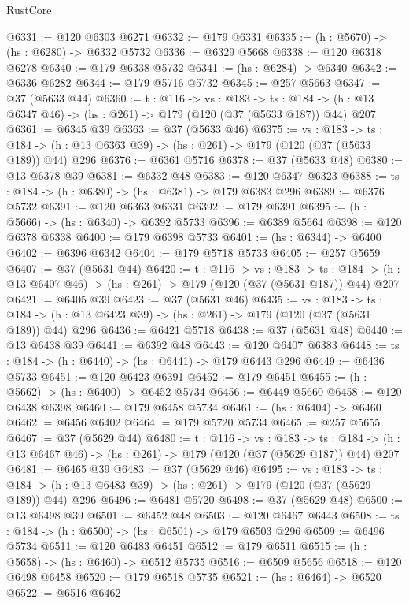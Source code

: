 \begin{lexlean}{RustCore}
\begin{coremodule}
@6331 := @120 @6303 @6271
@6332 := @179 @6331
@6335 := (h : @5670) -> (hs : @6280) -> @6332 @5732
@6336 := @6329 @5668
@6338 := @120 @6318 @6278
@6340 := @179 @6338 @5732
@6341 := (hs : @6284) -> @6340
@6342 := @6336 @6282
@6344 := @179 @5716 @5732
@6345 := @257 @5663
@6347 := @37 (@5633 @44)
@6360 := {t : @116} ->
  {vs : @183} ->
  {ts : @184} -> (h : @13 @6347 @46) -> (hs : @261) -> @179 (@120 (@37 (@5633 @187)) @44) @207
@6361 := @6345 @39
@6363 := @37 (@5633 @46)
@6375 := {vs : @183} ->
  {ts : @184} -> (h : @13 @6363 @39) -> (hs : @261) -> @179 (@120 (@37 (@5633 @189)) @44) @296
@6376 := @6361 @5716
@6378 := @37 (@5633 @48)
@6380 := @13 @6378 @39
@6381 := @6332 @48
@6383 := @120 @6347 @6323
@6388 := {ts : @184} -> (h : @6380) -> (hs : @6381) -> @179 @6383 @296
@6389 := @6376 @5732
@6391 := @120 @6363 @6331
@6392 := @179 @6391
@6395 := (h : @5666) -> (hs : @6340) -> @6392 @5733
@6396 := @6389 @5664
@6398 := @120 @6378 @6338
@6400 := @179 @6398 @5733
@6401 := (hs : @6344) -> @6400
@6402 := @6396 @6342
@6404 := @179 @5718 @5733
@6405 := @257 @5659
@6407 := @37 (@5631 @44)
@6420 := {t : @116} ->
  {vs : @183} ->
  {ts : @184} -> (h : @13 @6407 @46) -> (hs : @261) -> @179 (@120 (@37 (@5631 @187)) @44) @207
@6421 := @6405 @39
@6423 := @37 (@5631 @46)
@6435 := {vs : @183} ->
  {ts : @184} -> (h : @13 @6423 @39) -> (hs : @261) -> @179 (@120 (@37 (@5631 @189)) @44) @296
@6436 := @6421 @5718
@6438 := @37 (@5631 @48)
@6440 := @13 @6438 @39
@6441 := @6392 @48
@6443 := @120 @6407 @6383
@6448 := {ts : @184} -> (h : @6440) -> (hs : @6441) -> @179 @6443 @296
@6449 := @6436 @5733
@6451 := @120 @6423 @6391
@6452 := @179 @6451
@6455 := (h : @5662) -> (hs : @6400) -> @6452 @5734
@6456 := @6449 @5660
@6458 := @120 @6438 @6398
@6460 := @179 @6458 @5734
@6461 := (hs : @6404) -> @6460
@6462 := @6456 @6402
@6464 := @179 @5720 @5734
@6465 := @257 @5655
@6467 := @37 (@5629 @44)
@6480 := {t : @116} ->
  {vs : @183} ->
  {ts : @184} -> (h : @13 @6467 @46) -> (hs : @261) -> @179 (@120 (@37 (@5629 @187)) @44) @207
@6481 := @6465 @39
@6483 := @37 (@5629 @46)
@6495 := {vs : @183} ->
  {ts : @184} -> (h : @13 @6483 @39) -> (hs : @261) -> @179 (@120 (@37 (@5629 @189)) @44) @296
@6496 := @6481 @5720
@6498 := @37 (@5629 @48)
@6500 := @13 @6498 @39
@6501 := @6452 @48
@6503 := @120 @6467 @6443
@6508 := {ts : @184} -> (h : @6500) -> (hs : @6501) -> @179 @6503 @296
@6509 := @6496 @5734
@6511 := @120 @6483 @6451
@6512 := @179 @6511
@6515 := (h : @5658) -> (hs : @6460) -> @6512 @5735
@6516 := @6509 @5656
@6518 := @120 @6498 @6458
@6520 := @179 @6518 @5735
@6521 := (hs : @6464) -> @6520
@6522 := @6516 @6462

\end{coremodule}
\end{lexlean}
